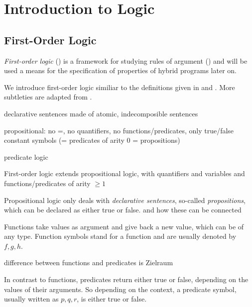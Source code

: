 \chapter{Introduction to Logic}
    \label{sec:introduction-logic}

    \section{First-Order Logic}
        \label{sec:first-order-logic}

        \textit{First-order logic} (\FOL) is a framework for studying rules of argument (\cite{hodges2001ClassicalLogic}) and will be used a means for the specification of properties of hybrid programs later on.

        We introduce first-order logic similiar to the definitions given in \cite{Platzer10HybridSystems} and \cite{Huth04LogicInCS}. More subtleties are adapted from \cite{hodges2001ClassicalLogic}.

        declarative sentences made of atomic, indecomposible sentences


        propositional: no =, no quantifiers, no functions/predicates, only true/false constant symbols (= predicates of arity 0 = propositions)


        predicate logic

        First-order logic extends propositional logic,
        with quantifiers
        and variables
        and functions/predicates of arity $\geq 1$

        Propositional logic only deals with \textit{declarative sentences}, so-called \textit{propositions}, which can be declared as either true or false. and how these can be connected



        Functions take values as argument and give back a new value, which can be of any type. Function symbols stand for a function and are usually denoted by $f,g,h$.

        difference between functions and predicates is Zielraum

        In contrast to functions, predicates return either true or false, depending on the values of their arguments.
        So depending on the context, a predicate symbol, usually written as $p,q,r$, is either true or false.

